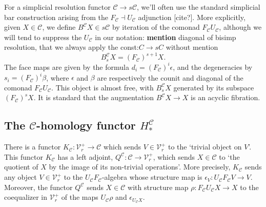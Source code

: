 \documentclass[11pt]{amsart}
\theoremstyle{plain}
\theoremstyle{definition}
\renewcommand{\to}{\longrightarrow}
\newcommand{\calC}{\mathcal{C}}
\newcommand{\calV}{\mathcal{V}}
\theoremstyle{plain}
\newcommand{\vect}[2]{\calV^{#1}_{#2}}
\begin{document}
\begin{Conventions and notation}
For a simplicial resolution functor $\calC\to s\calC$, we'll often use the standard simplicial bar construction arising from the $F_\calC\dashv U_\calC$ adjunction [cite?]. More explicitly, given $X\in\calC$, we define $B^\calC X\in s\calC$ by iteration of the comonad $F_\calC U_\calC$, although we will tend to suppress the $U_\calC$ in our notation: \textbf{mention} diagonal of bisimp resolution, that we always apply the const:$C\to sC$ without mention
\[B_s^\calC X=(F_\calC)^{s+1}X.\]
The face maps are given by the formula $d_i=(F_\calC)^i\epsilon$, and the degeneracies by $s_i=(F_\calC)^i\beta$, where $\epsilon$ and $\beta$ are respectively the counit and diagonal of the comonad $F_\calC U_\calC$. This object is almost free, with $B_s^\calC X$ generated by its subspace $(F_{\calC})^sX$. It is standard that the augmentation $B^\calC X\to X$ is an acyclic fibration.


\subsection{The $\calC$-homology functor $H^{\calC}_*$}
There is a functor $K_\calC:\vect{+}{r}\to \calC$ which sends $V\in\vect{+}{r}$ to the `trivial object on $V$'. This functor $K_{\calC}$ has a left adjoint, $Q^{\calC}:\calC\to\vect{+}{r}$, which sends $X\in\calC$ to `the quotient of $X$ by the image of its non-trivial operations'. More precisely, $K_\calC$ sends any object $V\in\vect{+}{r}$ to the $U_{\calC}F_{\calC}$-algebra whose structure map is $\epsilon_V:U_{\calC}F_{\calC}V\to V$. Moreover, the functor $Q^{\calC}$ sends $X\in \calC$ with structure map $\rho:F_\calC U_\calC X\to X$ to the coequalizer in $\vect{+}{r}$ of the maps $U_\calC\rho$ and $\epsilon_{U_\calC X}$.


\end{Conventions and notation}
\end{document}
